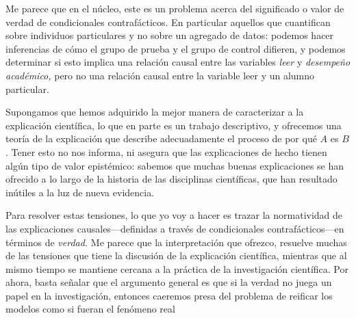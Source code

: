 {Me parece que en el núcleo, este es un problema acerca del significado o valor de
verdad de condicionales contrafácticos. En particular
aquellos que cuantifican sobre individuos particulares y no
sobre un agregado de datos:
podemos hacer inferencias de cómo el grupo de prueba y el
grupo de control difieren, y podemos determinar si esto
implica una relación causal entre las variables \emph{leer}
y \emph{desempeño académico,} pero no una relación causal
entre la variable leer y un alumno particular.



Supongamos que hemos adquirido la
mejor manera de caracterizar a la explicación científica, lo
que en parte es un trabajo descriptivo, y ofrecemos una
teoría de la explicación que describe adecuadamente el
proceso de  por qué $ A $
es $ B $. Tener esto no nos informa, ni asegura que las
explicaciones de hecho tienen algún tipo de valor
epistémico: sabemos que muchas buenas explicaciones
se han ofrecido a lo largo de la historia de las disciplinas
científicas, que han resultado inútiles a la luz de nueva
evidencia.

Para resolver estas tensiones, lo que yo voy a hacer es
trazar la normatividad de las explicaciones
causales---definidas a través de condicionales contrafácticos---en términos de
\emph{verdad.} Me parece que la interpretación que ofrezco,
resuelve muchas de las tensiones que tiene la discusión de
la explicación científica, mientras que al mismo tiempo se
mantiene cercana a la práctica de la investigación
científica.  Por ahora, basta señalar que el argumento
general es que si la verdad no juega un
papel en la investigación, entonces caeremos presa del
problema de reificar los
modelos como si fueran el fenómeno real



}
